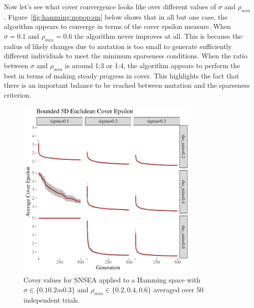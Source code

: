 \documentclass[twoside]{article}
\begin{document}
Now let's see what cover convergence looks like over different values of $\sigma$ and $\rho_{min}$.  Figure~\ref{fig:hamming:nopop:sm} below shows that in all but one case, the algorithm appears to converge in terms of the cover epsilon measure.  When $\sigma=0.1$ and $\rho_{min} = 0.6$ the algorithm never improves at all.  This is because the radius of likely changes due to mutation is too small to generate sufficiently different individuals to meet the minimum sparseness conditions.  When the ratio between $\sigma$ and $\rho_{min}$ is around 1:3 or 1:4, the algorithm appears to perform the best in terms of making steady progress in cover.  This highlights the fact that there is an important balance to be reached between mutation and the sparseness criterion.
%
\begin{figure}[t]
\includegraphics[width=0.8\textwidth]{Figures/bounded-500sm-NOPOP.pdf}
\caption{\label{fig:bounded:nopop:sm} Cover values for SNSEA applied to a Hamming space with $\sigma\in\{0.1  0.2m 0.3\}$ and $\rho_{min} \in \{0.2, 0.4, 0.6\}$ averaged over 50 independent trials.}
\end{figure}
%
\end{document}
